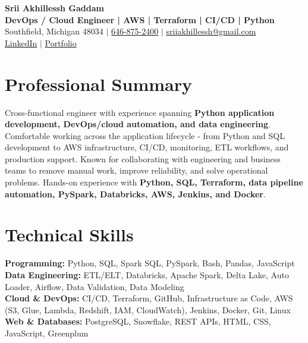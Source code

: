 \documentclass[letterpaper,10pt]{article}
\begin{document}
\fontsize{9.35pt}{10.45pt}\selectfont

\begin{center}
    {\LARGE \textbf{Srii Akhillessh Gaddam}} \\[-1pt]
    \textbf{DevOps / Cloud Engineer | AWS | Terraform | CI/CD | Python} \\[2pt]
    Southfield, Michigan 48034 $|$
    \href{tel:6468752400}{646-875-2400} $|$
    \href{mailto:sriiakhillessh@gmail.com}{sriiakhillessh@gmail.com} \\[1pt]
    \href{https://www.linkedin.com/in/srii-akhiilessh-gaddam-b48668191/}{LinkedIn} $|$
    \href{https://sriiakhillesshg.github.io/portfolio/}{Portfolio}
\end{center}
\vspace{-8pt}

\section{Professional Summary}
\small{Cross-functional engineer with experience spanning \textbf{Python application development, DevOps/cloud automation, and data engineering}. Comfortable working across the application lifecycle - from Python and SQL development to AWS infrastructure, CI/CD, monitoring, ETL workflows, and production support. Known for collaborating with engineering and business teams to remove manual work, improve reliability, and solve operational problems. Hands-on experience with \textbf{Python, SQL, Terraform, data pipeline automation, PySpark, Databricks, AWS, Jenkins, and Docker}.}

\section{Technical Skills}
\small{
\textbf{Programming:} Python, SQL, Spark SQL, PySpark, Bash, Pandas, JavaScript \\
\textbf{Data Engineering:} ETL/ELT, Databricks, Apache Spark, Delta Lake, Auto Loader, Airflow, Data Validation, Data Modeling \\
\textbf{Cloud \& DevOps:} CI/CD, Terraform, GitHub, Infrastructure as Code, AWS (S3, Glue, Lambda, Redshift, IAM, CloudWatch), Jenkins, Docker, Git, Linux \\
\textbf{Web \& Databases:} PostgreSQL, Snowflake, REST APIs, HTML, CSS, JavaScript, Greenplum
}
\end{document}

